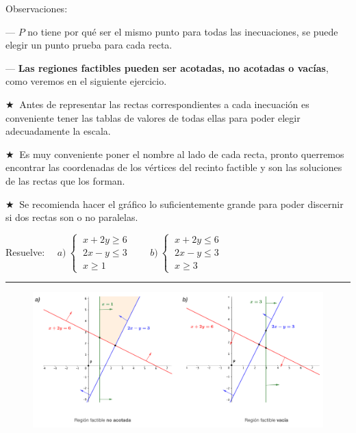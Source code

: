 \begin{miejemplo}
Observaciones:

--- $P$ no tiene por qué ser el mismo punto para todas las inecuaciones, se puede elegir un punto prueba para cada recta.

--- \textbf{Las regiones factibles pueden ser acotadas, no acotadas o vacías}, como veremos en el siguiente ejercicio.
\end{miejemplo}

\vspace{5mm}
\begin{destacado}
$\bigstar \ $ Antes de representar las rectas correspondientes a cada inecuación es conveniente tener las tablas de valores de todas ellas para poder elegir adecuadamente la escala. 

$\bigstar \ $ Es muy conveniente poner el nombre al lado de cada recta, pronto querremos encontrar las coordenadas de los vértices del recinto factible y son las soluciones de las rectas que los forman.

$\bigstar \ $ Se recomienda hacer el gráfico	lo suficientemente grande para poder discernir si dos rectas son o no paralelas.
\end{destacado}


\vspace{5mm}
\begin{miejercicio}

Resuelve: $\quad a) \ \begin{cases}
 \ x+2y\ge 6\\ \ 2x-y\le 3	\\ \ x\ge 1
 \end{cases} \qquad
 b) \ \begin{cases}
  \ x+2y\le 6\\ \ 2x-y\le 3	\\ \ x\ge 3
 \end{cases}$


\rule{150pt}{0.1pt}
\vspace{3mm}




\begin{figure}[H]
	\centering
	\includegraphics[width=1\textwidth]{imagenes/img09.png}
\end{figure}
\end{miejercicio}


